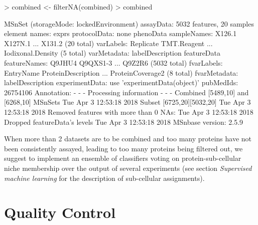 \begin{Schunk}
\begin{Sinput}
> combined <- filterNA(combined)
> combined
\end{Sinput}
\begin{Soutput}
MSnSet (storageMode: lockedEnvironment)
assayData: 5032 features, 20 samples 
  element names: exprs 
protocolData: none
phenoData
  sampleNames: X126.1 X127N.1 ... X131.2 (20 total)
  varLabels: Replicate TMT.Reagent ... Iodixonal.Density (5 total)
  varMetadata: labelDescription
featureData
  featureNames: Q9JHU4 Q9QXS1-3 ... Q9Z2R6 (5032 total)
  fvarLabels: EntryName ProteinDescription ... ProteinCoverage2 (8
    total)
  fvarMetadata: labelDescription
experimentData: use 'experimentData(object)'
  pubMedIds: 26754106 
Annotation:  
- - - Processing information - - -
Combined [5489,10] and [6268,10] MSnSets Tue Apr  3 12:53:18 2018 
Subset [6725,20][5032,20] Tue Apr  3 12:53:18 2018 
Removed features with more than 0 NAs: Tue Apr  3 12:53:18 2018 
Dropped featureData's levels Tue Apr  3 12:53:18 2018 
 MSnbase version: 2.5.9 
\end{Soutput}
\end{Schunk}

When more than 2 datasets are to be combined and too many proteins
have not been consistently assayed, leading to too many proteins being
filtered out, we suggest to implement an ensemble of classifiers
voting on protein-sub-cellular niche membership over the output of
several experiments (see section \textit{Supervised machine learning}
for the description of sub-cellular assignments).

\section*{Quality Control}

